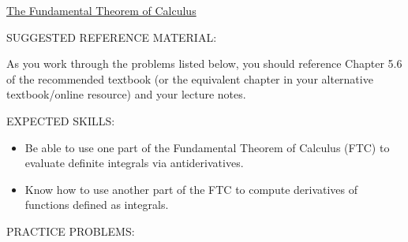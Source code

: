 \documentclass[12pt]{article}
\begin{document}
\begin{center}
\underline{\LARGE{The Fundamental Theorem of Calculus}}
\end{center}

\noindent SUGGESTED REFERENCE MATERIAL:
	
\bigskip

\noindent As you work through the problems listed below, you should reference Chapter 5.6 of the recommended textbook (or the equivalent chapter in your alternative textbook/online resource) and your lecture notes.

\bigskip

\noindent EXPECTED SKILLS:

\begin{itemize}

\item Be able to use one part of the Fundamental Theorem of Calculus (FTC) to evaluate definite integrals via antiderivatives. 

\item Know how to use another part of the FTC to compute derivatives of functions defined as integrals.

\end{itemize}

\noindent PRACTICE PROBLEMS:

\medskip
\end{document}
